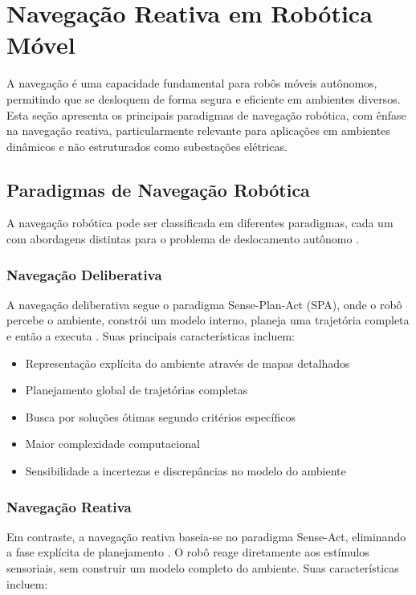 \section{Navegação Reativa em Robótica Móvel}

A navegação é uma capacidade fundamental para robôs móveis autônomos, permitindo que se desloquem de forma segura e eficiente em ambientes diversos. Esta seção apresenta os principais paradigmas de navegação robótica, com ênfase na navegação reativa, particularmente relevante para aplicações em ambientes dinâmicos e não estruturados como subestações elétricas.

\subsection{Paradigmas de Navegação Robótica}

A navegação robótica pode ser classificada em diferentes paradigmas, cada um com abordagens distintas para o problema de deslocamento autônomo \cite{Siegwart2011, Murphy2000}.

\subsubsection{Navegação Deliberativa}

A navegação deliberativa segue o paradigma Sense-Plan-Act (SPA), onde o robô percebe o ambiente, constrói um modelo interno, planeja uma trajetória completa e então a executa \cite{Murphy2000}. Suas principais características incluem:

\begin{itemize}
    \item Representação explícita do ambiente através de mapas detalhados
    \item Planejamento global de trajetórias completas
    \item Busca por soluções ótimas segundo critérios específicos
    \item Maior complexidade computacional
    \item Sensibilidade a incertezas e discrepâncias no modelo do ambiente
\end{itemize}

\subsubsection{Navegação Reativa}

Em contraste, a navegação reativa baseia-se no paradigma Sense-Act, eliminando a fase explícita de planejamento \cite{Brooks1986, Arkin1998}. O robô reage diretamente aos estímulos sensoriais, sem construir um modelo completo do ambiente. Suas características incluem:

